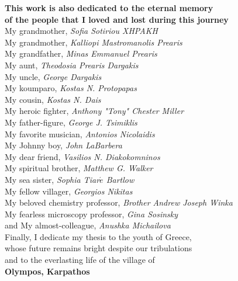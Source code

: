 \documentclass[12pt]{ucsddissertation}
\begin{document}
\begin{dedication}
\begin{center}
\vspace{0.3in}
\textbf{This work is also dedicated to the eternal memory \\of the people that I loved and lost during this journey} \\
\vspace{0.1in}
My grandmother, \textit{Sofia Sotiriou XHPAKH}\\
My grandmother, \textit{Kalliopi Mastromanolis Prearis}\\
My grandfather,  \textit{Minas Emmanuel Prearis}\\
My aunt, \textit{Theodosia Prearis Dargakis}\\
My uncle, \textit{George Dargakis}\\
My koumparo, \textit{Kostas N. Protopapas}\\
My cousin, \textit{Kostas N. Dais}\\
My heroic fighter, \textit{Anthony "Tony" Chester Miller}\\
My father-figure, \textit{George J. Tsimiklis}\\
My favorite musician, \textit{Antonios Nicolaidis}\\
My Johnny boy, \textit{John LaBarbera}\\
My dear friend, \textit{Vasilios N. Diakokomninos}\\
My spiritual brother, \textit{Matthew G. Walker}\\
My sea sister, \textit{Sophia Tiar$\acute{e}$ Bartlow}\\
My fellow villager, \textit{Georgios Nikitas}\\
My beloved chemistry professor, \textit{Brother Andrew Joseph Winka}\\
My fearless microscopy professor, \textit{Gina Sosinsky}\\
and My almost-colleague, \textit{Anushka Michailova}\\

\vspace{0.2in}
 Finally, I dedicate my thesis to the youth of Greece, \\whose future remains bright despite our tribulations\\ and to the everlasting life of the village of\\ \textbf{Olympos, Karpathos}
\end{center}

\end{dedication}
\end{document}
